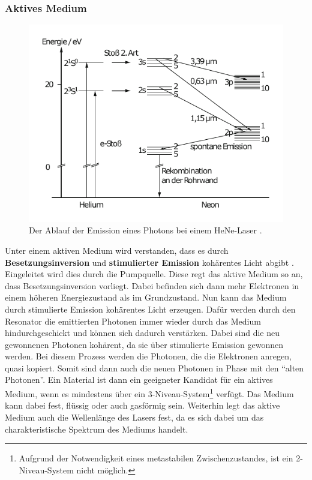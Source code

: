 \subsubsection*{Aktives Medium}
\begin{figure}
    \includegraphics[width=0.8\linewidth]{pictures/HeNe_levels.pdf}
    \caption{Der Ablauf der Emission eines Photons bei einem HeNe-Laser \cite{HeNe_levels}.}
    \label{fig:HeNe_levels}
\end{figure}
Unter einem aktiven Medium wird verstanden, dass es durch \textbf{Besetzungsinversion} und \textbf{stimulierter Emission} kohärentes Licht abgibt \cite{demtroeder_laser}.
Eingeleitet wird dies durch die Pumpquelle.
Diese regt das aktive Medium so an, dass Besetzungsinversion vorliegt.
Dabei befinden sich dann mehr Elektronen in einem höheren Energiezustand als im Grundzustand.
Nun kann das Medium durch stimulierte Emission kohärentes Licht erzeugen.
Dafür werden durch den Resonator die emittierten Photonen immer wieder durch das Medium hindurchgeschickt und können sich dadurch verstärken.
Dabei sind die neu gewonnenen Photonen kohärent, da sie über stimulierte Emission gewonnen werden.
Bei diesem Prozess werden die Photonen, die die Elektronen anregen, quasi kopiert.
Somit sind dann auch die neuen Photonen in Phase mit den \enquote{alten Photonen}.
Ein Material ist dann ein geeigneter Kandidat für ein aktives Medium, wenn es mindestens über ein 3-Niveau-System\footnote{Aufgrund der Notwendigkeit eines metastabilen Zwischenzustandes, ist ein 2-Niveau-System nicht möglich.} verfügt.
Das Medium kann dabei fest, flüssig oder auch gasförmig sein.
Weiterhin legt das aktive Medium auch die Wellenlänge des Lasers fest, da es sich dabei um das charakteristische Spektrum des Mediums handelt.


